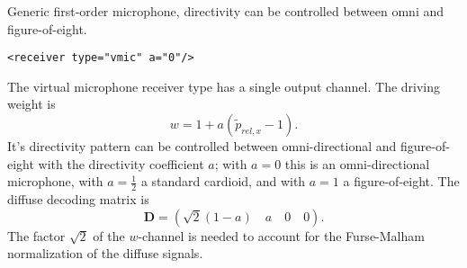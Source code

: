 Generic first-order microphone, directivity can be controlled between
omni and figure-of-eight.

\begin{lstlisting}[numbers=none]
<receiver type="vmic" a="0"/>
\end{lstlisting}

The virtual microphone receiver type has a single output channel. The
driving weight is
\begin{equation}
w = 1 + a (\tilde{p}_{rel,x} - 1).
\end{equation}
It's directivity pattern can be controlled between omni-directional and
figure-of-eight with the directivity coefficient $a$; with $a=0$ this
is an omni-directional microphone, with $a=\frac12$ a standard
cardioid, and with $a=1$ a figure-of-eight.
%
The diffuse decoding matrix is
\begin{equation}
\mathbf{D} = \left( \sqrt{2}(1-a) \quad a \quad 0\quad  0 \right).
\end{equation}
The factor \(\sqrt{2}\) of the \(w\)-channel is needed to account for
the Furse-Malham normalization of the diffuse signals.


